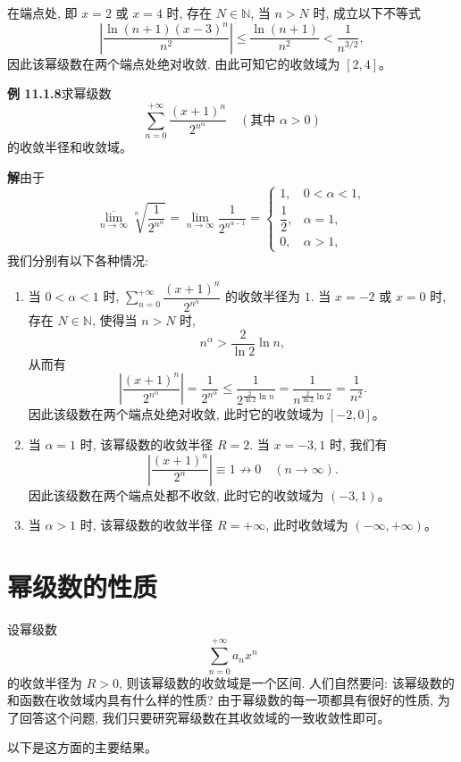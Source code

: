 \documentclass[UTF8, 12pt, fontset=fandol, oneside]{ctexart}
\begin{document}
在端点处, 即 $x=2$ 或 $x=4$ 时, 存在 $N\in\mathbb N$, 当 $n>N$ 时, 成立以下不等式
\[
  \left|\frac{\ln(n+1)(x-3)^n}{n^2}\right|
  \leqslant
  \frac{\ln(n+1)}{n^2}
  <
  \frac1{n^{3/2}},
\]
因此该幂级数在两个端点处绝对收敛. 由此可知它的收敛域为 $[2,4]$。

\noindent\textbf{例 11.1.8}\quad 求幂级数
\[
  \sum_{n=0}^{+\infty}\frac{(x+1)^n}{2^{n^\alpha}}
  \quad(\text{其中 }\alpha>0)
\]
的收敛半径和收敛域。

\noindent\textbf{解}\quad 由于
\[
  \overline{\lim_{n\to\infty}}\sqrt[n]{\frac1{2^{n^\alpha}}}
  =
  \lim_{n\to\infty}\frac1{2^{n^{\alpha-1}}}
  =
  \begin{cases}
    1, &0<\alpha<1,\\
    \dfrac12, &\alpha=1,\\
    0, &\alpha>1,
  \end{cases}
\]
我们分别有以下各种情况:
\begin{enumerate}
  \item 当 $0<\alpha<1$ 时, $\sum_{n=0}^{+\infty}\dfrac{(x+1)^n}{2^{n^\alpha}}$ 的收敛半径为 $1$. 当 $x=-2$ 或 $x=0$ 时, 存在 $N\in\mathbb N$, 使得当 $n>N$ 时,
  \[
    n^\alpha>\frac2{\ln2}\ln n,
  \]
  从而有
  \[
    \left|\frac{(x+1)^n}{2^{n^\alpha}}\right|
    =
    \frac1{2^{n^\alpha}}
    \leqslant
    \frac1{2^{\frac2{\ln2}\ln n}}
    =
    \frac1{n^{\frac2{\ln2}\ln2}}
    =
    \frac1{n^2}.
  \]
  因此该级数在两个端点处绝对收敛, 此时它的收敛域为 $[-2,0]$。

  \item 当 $\alpha=1$ 时, 该幂级数的收敛半径 $R=2$. 当 $x=-3,1$ 时, 我们有
  \[
    \left|\frac{(x+1)^n}{2^n}\right|\equiv1\nrightarrow0\quad(n\to\infty).
  \]
  因此该级数在两个端点处都不收敛, 此时它的收敛域为 $(-3,1)$。

  \item 当 $\alpha>1$ 时, 该幂级数的收敛半径 $R=+\infty$, 此时收敛域为 $(-\infty,+\infty)$。
\end{enumerate}

\section{幂级数的性质}

设幂级数
\[
  \sum_{n=0}^{+\infty}a_nx^n
\]
的收敛半径为 $R>0$, 则该幂级数的收敛域是一个区间. 人们自然要问: 该幂级数的和函数在收敛域内具有什么样的性质? 由于幂级数的每一项都具有很好的性质, 为了回答这个问题, 我们只要研究幂级数在其收敛域的一致收敛性即可。

以下是这方面的主要结果。
\end{document}
